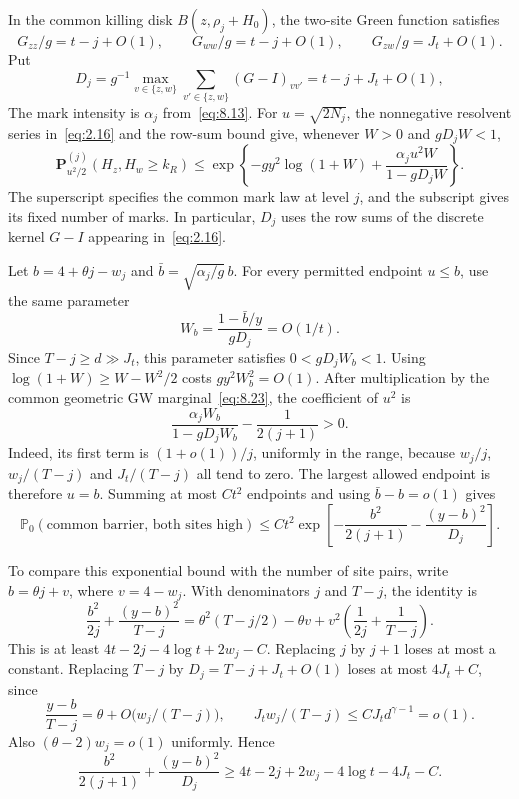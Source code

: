 \documentclass[11pt,a4paper]{article}
\numberwithin{equation}{section}
\theoremstyle{remark}
\begin{document}
In the common killing disk $B(z,\rho_j+H_0)$, the two-site Green function satisfies
\[
G_{zz}/g=t-j+O(1),\qquad G_{ww}/g=t-j+O(1),\qquad
G_{zw}/g=J_t+O(1).
\]
Put
\begin{equation}\label{eq:9.8}
D_j=g^{-1}\max_{v\in\{z,w\}}
\sum_{v'\in\{z,w\}}(G-I)_{vv'}
=t-j+J_t+O(1),
\end{equation}
The mark intensity is $\alpha_j$ from~\eqref{eq:8.13}. For $u=\sqrt{2N_j}$, the nonnegative resolvent series in~\eqref{eq:2.16} and the row-sum bound give, whenever $W>0$ and $gD_jW<1$,
\begin{equation}\label{eq:9.9}
\mathbf P_{u^2/2}^{(j)}(H_z,H_w\ge k_R)
\le\exp\left\{-gy^2\log(1+W)
+\frac{\alpha_j u^2W}{1-gD_jW}\right\}.
\end{equation}
The superscript specifies the common mark law at level $j$, and the subscript gives its fixed number of marks. In particular, $D_j$ uses the row sums of the discrete kernel $G-I$ appearing in~\eqref{eq:2.16}.

Let $b=4+\theta j-w_j$ and $\bar b=\sqrt{\alpha_j/g}\,b$. For every permitted endpoint $u\le b$, use the same parameter
\begin{equation}\label{eq:9.10}
W_b=\frac{1-\bar b/y}{gD_j}=O(1/t).
\end{equation}
Since $T-j\ge d\gg J_t$, this parameter satisfies $0<gD_jW_b<1$. Using $\log(1+W)\ge W-W^2/2$ costs $gy^2W_b^2=O(1)$. After multiplication by the common geometric GW marginal~\eqref{eq:8.23}, the coefficient of $u^2$ is
\[
\frac{\alpha_jW_b}{1-gD_jW_b}-\frac1{2(j+1)}>0.
\]
Indeed, its first term is $(1+o(1))/j$, uniformly in the range, because
$w_j/j$, $w_j/(T-j)$ and $J_t/(T-j)$ all tend to zero. The largest allowed endpoint is therefore $u=b$. Summing at most $Ct^2$ endpoints and using $\bar b-b=o(1)$ gives
\begin{equation}\label{eq:9.11}
\mathbb P_0(\text{common barrier, both sites high})
\le Ct^2\exp\left[-\frac{b^2}{2(j+1)}-\frac{(y-b)^2}{D_j}\right].
\end{equation}

To compare this exponential bound with the number of site pairs, write $b=\theta j+v$, where $v=4-w_j$. With denominators $j$ and $T-j$, the identity is
\begin{equation}\label{eq:9.12}
\frac{b^2}{2j}+\frac{(y-b)^2}{T-j}
=\theta^2(T-j/2)-\theta v
+v^2\left(\frac1{2j}+\frac1{T-j}\right).
\end{equation}
This is at least $4t-2j-4\log t+2w_j-C$. Replacing $j$ by $j+1$ loses at most a constant. Replacing $T-j$ by
$D_j=T-j+J_t+O(1)$ loses at most $4J_t+C$, since
\[
\frac{y-b}{T-j}=\theta+O\bigl(w_j/(T-j)\bigr),
\qquad J_t w_j/(T-j)\le C J_t d^{\gamma-1}=o(1).
\]
Also $(\theta-2)w_j=o(1)$ uniformly. Hence
\begin{equation}\label{eq:9.13}
\frac{b^2}{2(j+1)}+\frac{(y-b)^2}{D_j}
\ge4t-2j+2w_j-4\log t-4J_t-C.
\end{equation}
\end{document}

